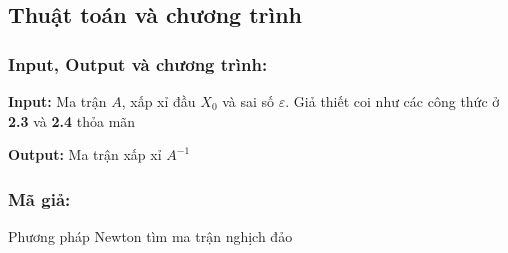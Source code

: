     \subsection{Thuật toán và chương trình}
        \subsubsection{Input, Output và chương trình:} 
            \par \textbf{Input:} Ma trận $A$, xấp xỉ đầu $X_{0}$ và sai số $\varepsilon$. Giả thiết coi như các công thức ở \textbf{2.3} và \textbf{2.4} thỏa mãn
            \par \textbf{Output:} Ma trận xấp xỉ $A^{-1}$


        \subsubsection{Mã giả:}
            \IncMargin{1em}\begin{algorithm}[H]
                \caption{Phương pháp Newton tìm ma trận nghịch đảo \label{IR}}
                \SetAlgoLined     
            \end{algorithm}\DecMargin{1em}


